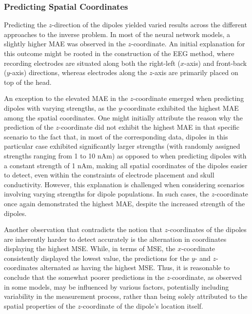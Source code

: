 \documentclass[a4paper, UKenglish, 11pt]{uiomaster}
\begin{document}

\subsubsection{Predicting Spatial Coordinates}
Predicting the $z$-direction of the dipoles yielded varied results across the different approaches to the inverse problem. In most of the neural network models, a slightly higher MAE was observed in the $z$-coordinate. An initial explanation for this outcome might be rooted in the construction of the EEG method, where recording electrodes are situated along both the right-left ($x$-axis) and front-back ($y$-axis) directions, whereas electrodes along the $z$-axis are primarily placed on top of the head.

An exception to the elevated MAE in the $z$-coordinate emerged when predicting dipoles with varying strengths, as the $y$-coordinate exhibited the highest MAE among the spatial coordinates. One might initially attribute the reason why the prediction of the $z$-coordinate did not exhibit the highest MAE in that specific scenario to the fact that, in most of the corresponding data, dipoles in this particular case exhibited significantly larger strengths (with randomly assigned strengths ranging from 1 to 10 nAm) as opposed to when predicting dipoles with a constant strength of 1 nAm, making all spatial coordinates of the dipoles easier to detect, even within the constraints of electrode placement and skull conductivity. However, this explanation is challenged when considering scenarios involving varying strengths for dipole populations. In such cases, the $z$-coordinate once again demonstrated the highest MAE, despite the increased strength of the dipoles.

Another observation that contradicts the notion that $z$-coordinates of the dipoles are inherently harder to detect accurately is the alternation in coordinates displaying the highest MSE. While, in terms of MSE, the $x$-coordinate consistently displayed the lowest value, the predictions for the $y$- and $z$-coordinates alternated as having the highest MSE. Thus, it is reasonable to conclude that the somewhat poorer predictions in the $z$-coordinate, as observed in some models, may be influenced by various factors, potentially including variability in the measurement process, rather than being solely attributed to the spatial properties of the $z$-coordinate of the dipole's location itself.
\end{document}
